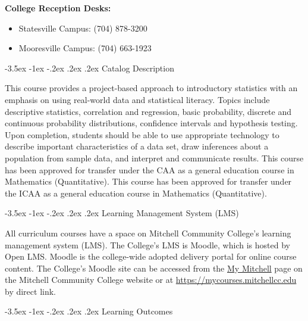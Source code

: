 \documentclass{article}
\makeatletter
\renewcommand\section{\@startsection{section}{1}{0pt}%
  {-3.5ex \@plus -1ex \@minus -.2ex}%
  {.2ex \@plus.2ex}%
  {\normalfont\Large\bfseries}} %
\makeatother
\begin{document}
\textbf{College Reception Desks:}

\begin{itemize}
\item Statesville Campus: (704) 878-3200
\item Mooresville Campus: (704) 663-1923
\end{itemize}

\section{Catalog Description}

This course provides a project-based approach to introductory statistics with an emphasis on using real-world data and statistical literacy. Topics include descriptive statistics, correlation and regression, basic probability, discrete and continuous probability distributions, confidence intervals and hypothesis testing. Upon completion, students should be able to use appropriate technology to describe important characteristics of a data set, draw inferences about a population from sample data, and interpret and communicate results. This course has been approved for transfer under the CAA as a general education course in Mathematics (Quantitative). This course has been approved for transfer under the ICAA as a general education course in Mathematics (Quantitative).

\section{Learning Management System (LMS)}

All curriculum courses have a space on Mitchell Community College's learning management system (LMS). The College's LMS is Moodle, which is hosted by Open LMS. Moodle is the college-wide adopted delivery portal for online course content. The College's Moodle site can be accessed from the \href{https://mitchellcc.edu/my-mitchell}{My Mitchell} page on the Mitchell Community College website or at \href{https://mycourses.mitchellcc.edu}{https://mycourses.mitchellcc.edu} by direct link.

\section{Learning Outcomes}
\end{document}
